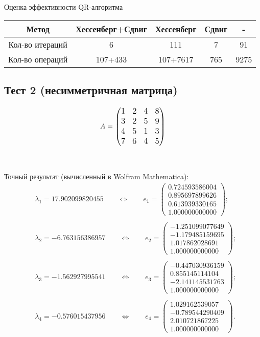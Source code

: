 \documentclass[12pt, a4paper]{article}
\begin{document}
Оценка эффективности QR-алгоритма

\begin{center}
	\begin{tabular}{|c|c|c|c|c|}
		\hline
		\textbf{Метод}        & \textbf{{Хессенберг+Сдвиг}}&\textbf{{Хессенберг}}&\textbf{{Сдвиг}}&\textbf{{-}} \\ \hline
		Кол-во итераций &6&111&7&91           \\ \hline
			Кол-во операций &107+433&107+7617&765&9275           \\ \hline
	\end{tabular}
\end{center}
	
	\newpage
	\subsection{Тест 2 (несимметричная матрица)}
		\[
	\large A = \begin{pmatrix}
		1 & 2 & 4 & 8 \\
		3 & 2 & 5 & 9 \\
		4 & 5 & 1 & 3 \\
		7 & 6 & 4 & 5
	\end{pmatrix}
	\]
	\\\\
	Точный результат (вычисленный в Wolfram Mathematica):
	\begin{eqnarray*}
		& \lambda_1 = 17.902099820455 \qquad \Longleftrightarrow \qquad e_1 = \begin{pmatrix}
			0.724593586004\\ 0.895697899626\\ 0.613939330165\\1.000000000000
		\end{pmatrix};\\\\
		& \lambda_2 = -6.763156386957 \qquad \Longleftrightarrow \qquad e_2 = \begin{pmatrix}
			-1.251099077649\\-1.179485159695\\ 1.017862028691\\ 1.000000000000
		\end{pmatrix};\\\\
		& \lambda_3 = -1.562927995541 \qquad \Longleftrightarrow \qquad e_3 = \begin{pmatrix}
			-0.447030936159\\ 0.855145114104\\-2.141145531763\\ 1.000000000000
		\end{pmatrix};\\\\
		& \lambda_4 = -0.576015437956 \qquad \Longleftrightarrow \qquad e_4 = \begin{pmatrix}
			1.029162539057\\ -0.789544290409\\ 2.010721867225\\ 1.000000000000
		\end{pmatrix}.
	\end{eqnarray*}
\end{document}
